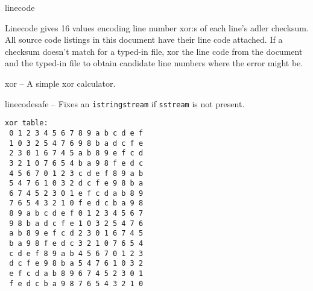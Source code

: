 \begin{algorithm}{linecode}

Linecode gives 16 values encoding line number xor:s of each line's adler
checksum. All source code listings in this document have their line code
attached. If a checksum doesn't match for a typed-in file, xor the line code
from the document and the typed-in file to obtain candidate line numbers where
the error might be.
\end{algorithm}

\begin{algorithm}{xor}
-- A simple xor calculator.
\end{algorithm}

\begin{algorithm}{linecodesafe}
-- Fixes an {\tt istringstream} if {\tt sstream} is not present.
\end{algorithm}

\begin{sourceslandscape}
\end{sourceslandscape}
\begin{sourceslandscape}
  \begin{verbatim}
xor table:
 0 1 2 3 4 5 6 7 8 9 a b c d e f
 1 0 3 2 5 4 7 6 9 8 b a d c f e
 2 3 0 1 6 7 4 5 a b 8 9 e f c d
 3 2 1 0 7 6 5 4 b a 9 8 f e d c
 4 5 6 7 0 1 2 3 c d e f 8 9 a b
 5 4 7 6 1 0 3 2 d c f e 9 8 b a
 6 7 4 5 2 3 0 1 e f c d a b 8 9
 7 6 5 4 3 2 1 0 f e d c b a 9 8
 8 9 a b c d e f 0 1 2 3 4 5 6 7
 9 8 b a d c f e 1 0 3 2 5 4 7 6
 a b 8 9 e f c d 2 3 0 1 6 7 4 5
 b a 9 8 f e d c 3 2 1 0 7 6 5 4
 c d e f 8 9 a b 4 5 6 7 0 1 2 3
 d c f e 9 8 b a 5 4 7 6 1 0 3 2
 e f c d a b 8 9 6 7 4 5 2 3 0 1
 f e d c b a 9 8 7 6 5 4 3 2 1 0
  \end{verbatim}
\end{sourceslandscape}
